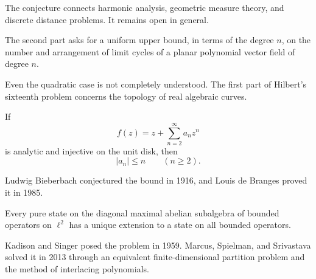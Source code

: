     \begin{remark}
        The conjecture connects harmonic analysis, geometric measure theory,
        and discrete distance problems. It remains open in general.
    \end{remark}

    \begin{openproblem}
        The second part asks for a uniform upper bound, in terms of the degree
        $n$, on the number and arrangement of limit cycles of a planar
        polynomial vector field of degree $n$.
    \end{openproblem}

    \begin{remark}
        Even the quadratic case is not completely understood. The first part of
        Hilbert's sixteenth problem concerns the topology of real algebraic
        curves.
    \end{remark}

    \begin{theorem}
        If
        \[
            f(z)=z+\sum_{n=2}^{\infty}a_nz^n
        \]
        is analytic and injective on the unit disk, then
        \[
            |a_n|\leq n
            \qquad
            (n\geq 2).
        \]
    \end{theorem}

    \begin{remark}
        Ludwig Bieberbach conjectured the bound in 1916, and Louis de Branges
        proved it in 1985.
    \end{remark}

    \begin{theorem}
        Every pure state on the diagonal maximal abelian subalgebra of
        bounded operators on $\ell^2$ has a unique extension to a state on all
        bounded operators.
    \end{theorem}

    \begin{remark}
        Kadison and Singer posed the problem in 1959. Marcus, Spielman, and
        Srivastava solved it in 2013 through an equivalent finite-dimensional
        partition problem and the method of interlacing polynomials.
    \end{remark}
